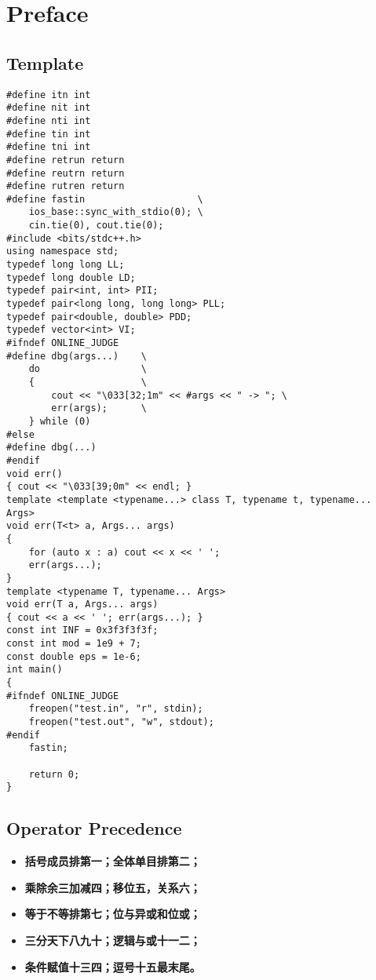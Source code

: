 \chapter{Preface}\label{chap:Template}
\section{Template}
\begin{lstlisting}
#define itn int
#define nit int
#define nti int
#define tin int
#define tni int
#define retrun return
#define reutrn return
#define rutren return
#define fastin                    \
    ios_base::sync_with_stdio(0); \
    cin.tie(0), cout.tie(0);
#include <bits/stdc++.h>
using namespace std;
typedef long long LL;
typedef long double LD;
typedef pair<int, int> PII;
typedef pair<long long, long long> PLL;
typedef pair<double, double> PDD;
typedef vector<int> VI;
#ifndef ONLINE_JUDGE
#define dbg(args...)    \
    do                  \
    {                   \
        cout << "\033[32;1m" << #args << " -> "; \
        err(args);      \
    } while (0)
#else
#define dbg(...)
#endif
void err() 
{ cout << "\033[39;0m" << endl; }
template <template <typename...> class T, typename t, typename... Args>
void err(T<t> a, Args... args)
{
    for (auto x : a) cout << x << ' ';
    err(args...);
}
template <typename T, typename... Args>
void err(T a, Args... args)
{ cout << a << ' '; err(args...); }
const int INF = 0x3f3f3f3f;
const int mod = 1e9 + 7;
const double eps = 1e-6;
int main()
{
#ifndef ONLINE_JUDGE
    freopen("test.in", "r", stdin);
    freopen("test.out", "w", stdout);
#endif
    fastin;

    return 0;
}
\end{lstlisting}

\section{Operator Precedence}
\begin{itemize}
    \item \textbf{括号成员排第一；全体单目排第二；}
    \item \textbf{乘除余三加减四；移位五，关系六；}
    \item \textbf{等于不等排第七；位与异或和位或；}
    \item \textbf{三分天下八九十；逻辑与或十一二；}
    \item \textbf{条件赋值十三四；逗号十五最末尾。}
\end{itemize}

